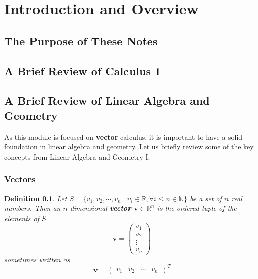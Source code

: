 \documentclass[12pt]{book}
\newcommand{\rbb}{\mathbb{R}}
\newcommand{\rbbm}{\mathbb{R}^m}
\newcommand{\rbbn}{\mathbb{R}^n}
\theoremstyle{definitionstyle}
\newtheorem{definition}{Definition}[section]
\numberwithin{equation}{section}
\begin{document}
\chapter*{Introduction and Overview}
\setcounter{page}{1}

\section{The Purpose of These Notes}


\newpage

\section{A Brief Review of Calculus 1}

\newpage

\section {A Brief Review of Linear Algebra and Geometry}

As this module is focused on \textbf{vector} calculus, it is important to have a solid foundation in linear algebra and geometry. Let us briefly review some of the key concepts from Linear Algebra and Geometry I.

\subsection{Vectors}

\begin{definition}
    Let $ S = \{ v_1, v_2, \cdots, v_n\;|\; v_i \in \rbb, \forall i \leq n \in \mathbb{N} \} $ be a set of $n$ real numbers. Then an $n$-dimensional \textbf{vector} $\mathbf{v} \in \rbb^n$ is the ordered tuple of the elements of $S$ 
    \begin{equation}
	\mathbf{v} = \begin{pmatrix} v_1 \\ v_2 \\ \vdots \\ v_n \end{pmatrix} 
    \end{equation}
    sometimes written as 
    \begin{equation}
	\mathbf{v} = \begin{pmatrix} v_1 & v_2 & \cdots & v_n \end{pmatrix}^T
    \end{equation}
\end{definition}
\end{document}
